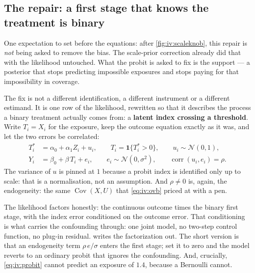 \subsection*{The repair: a first stage that knows the treatment is binary}

One expectation to set before the equations: after \cref{fig:iv:scaleknob}, this repair is
\emph{not} being asked to remove the bias. The scale-prior correction already did that with the
likelihood untouched. What the probit is asked to fix is the support --- a posterior that stops
predicting impossible exposures and stops paying for that impossibility in coverage.

The fix is not a different identification, a different instrument or a different estimand. It is one
row of the likelihood, rewritten so that it describes the process a binary treatment actually comes
from: a \textbf{latent index crossing a threshold}. Write $T_i = X_i$ for the exposure, keep the
outcome equation exactly as it was, and let the two errors be correlated:
%
\begin{align}
  T_i^{*} &= \alpha_0 + \alpha_1 Z_i + u_i, \qquad
  T_i = \mathbf 1\{T_i^{*} > 0\}, \qquad u_i \sim \mathcal N(0, 1),
    \label{eq:iv:probit}\\
  Y_i &= \beta_0 + \beta\,T_i + e_i, \qquad e_i \sim \mathcal N(0, \sigma^{2}),
    \qquad \operatorname{corr}(u_i, e_i) = \rho .
    \label{eq:iv:probit_out}
\end{align}
%
The variance of $u$ is pinned at $1$ because a probit index is identified only up to scale: that is a
normalisation, not an assumption. And $\rho \neq 0$ is, again, the endogeneity: the same
$\operatorname{Cov}(X, U)$ that \cref{eq:iv:ovb} priced at \eur{\nbElevenOvb} with a pen.

The likelihood factors honestly: the continuous outcome times the binary first stage, with the
index error conditioned on the outcome error. That conditioning is what carries the confounding
through: one joint model, no two-step control function, no plug-in residual.
 writes the factorization out. The short version is that an endogeneity term
$\rho\,e/\sigma$ enters the first stage; set it to zero and the model reverts to an ordinary probit
that ignores the confounding. And, crucially, \cref{eq:iv:probit} cannot predict an exposure of
$1.4$, because a Bernoulli cannot.

